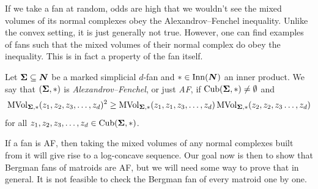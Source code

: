 \documentclass[12pt,oneside]{../../sfsuthesis}
\begin{document}
If we take a fan at random, odds are high that we wouldn't see the mixed volumes of its normal complexes obey the Alexandrov--Fenchel inequality.
Unlike the convex setting, it is just generally not true.
However, one can find examples of fans such that the mixed volumes of their normal complex do obey the inequality.
This is in fact a property of the fan itself.
\begin{definition}\th\label{def:AF}
    Let \( {\bm{\Sigma}} \subseteq \bm{N} \) be a marked simplicial \( d \)-fan and \( \ast \in \operatorname{Inn}(\bm{N}) \) an inner product.
    We say that \( ({\bm{\Sigma}}, \ast) \) is \emph{Alexandrov--Fenchel}, or just \emph{AF}, if \( \operatorname{Cub}({\bm{\Sigma}}, \ast) \neq \emptyset \) and
    \[
        \operatorname{MVol}_{{\bm{\Sigma}}, \ast}(z_1, z_2, z_3, \dots, z_d)^2 \geq  \operatorname{MVol}_{{\bm{\Sigma}}, \ast}(z_1, z_1, z_3, \dots, z_d)\operatorname{MVol}_{{\bm{\Sigma}}, \ast}(z_2, z_2, z_3 \dots, z_d)
    \]
    for all \( z_1, z_2, z_3, \dots, z_d \in \operatorname{Cub}({\bm{\Sigma}}, \ast) \).
\end{definition}
If a fan is AF, then taking the mixed volumes of any normal complexes built from it will give rise to a log-concave sequence.
Our goal now is then to show that Bergman fans of matroids are AF, but we will need some way to prove that in general.
It is not feasible to check the Bergman fan of every matroid one by one.
\end{document}
